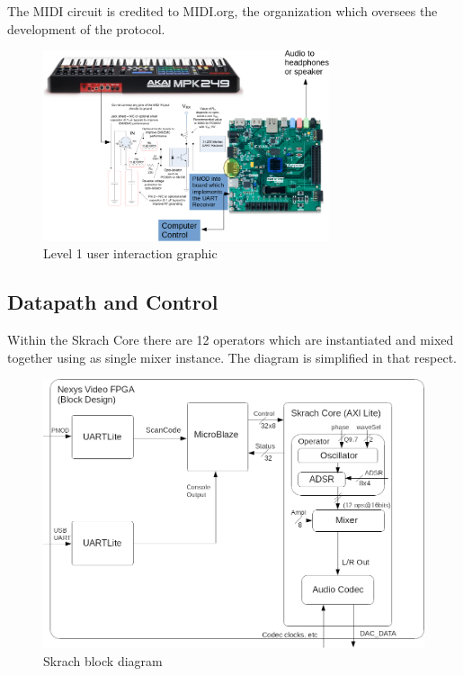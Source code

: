 \documentclass[12pt]{article}
\begin{document}
The MIDI circuit is credited to MIDI.org, the organization which oversees the development of the protocol.

\begin{figure}[htb]
    \centering
    \includegraphics[width=0.75\textwidth]{img/level_1_diagram.png}
    \caption{Level 1 user interaction graphic}
    \label{fig:level_1_figure}
\end{figure}

\subsection{Datapath and Control}

Within the Skrach Core there are 12 operators which are instantiated and mixed together using as single mixer instance. The diagram is simplified in that respect.

\begin{figure}[htb]
    \centering
    \includegraphics[width=\textwidth]{img/datapath_conrol.png}
    \caption{Skrach block diagram}
    \label{fig:block_diagram}
\end{figure}
\end{document}
